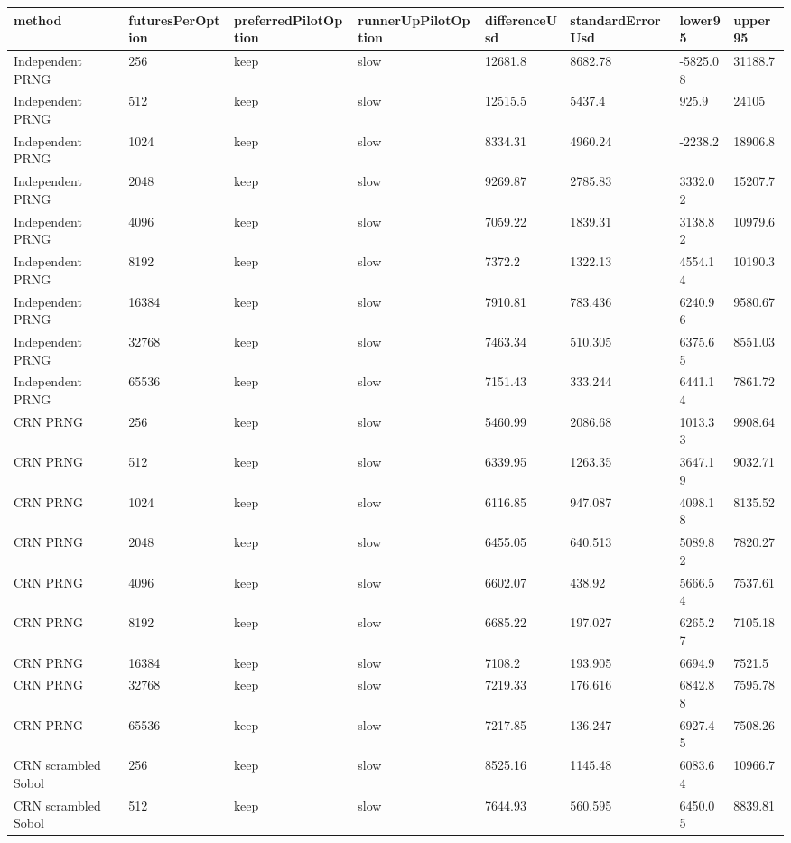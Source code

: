 \begin{tabular}{llllllll}
\toprule
method & futuresPerOption & preferredPilotOption & runnerUpPilotOption & differenceUsd & standardErrorUsd & lower95 & upper95 \\
\midrule
Independent PRNG & 256 & keep & slow & 12681.8 & 8682.78 & -5825.08 & 31188.7 \\
Independent PRNG & 512 & keep & slow & 12515.5 & 5437.4 & 925.9 & 24105 \\
Independent PRNG & 1024 & keep & slow & 8334.31 & 4960.24 & -2238.2 & 18906.8 \\
Independent PRNG & 2048 & keep & slow & 9269.87 & 2785.83 & 3332.02 & 15207.7 \\
Independent PRNG & 4096 & keep & slow & 7059.22 & 1839.31 & 3138.82 & 10979.6 \\
Independent PRNG & 8192 & keep & slow & 7372.2 & 1322.13 & 4554.14 & 10190.3 \\
Independent PRNG & 16384 & keep & slow & 7910.81 & 783.436 & 6240.96 & 9580.67 \\
Independent PRNG & 32768 & keep & slow & 7463.34 & 510.305 & 6375.65 & 8551.03 \\
Independent PRNG & 65536 & keep & slow & 7151.43 & 333.244 & 6441.14 & 7861.72 \\
CRN PRNG & 256 & keep & slow & 5460.99 & 2086.68 & 1013.33 & 9908.64 \\
CRN PRNG & 512 & keep & slow & 6339.95 & 1263.35 & 3647.19 & 9032.71 \\
CRN PRNG & 1024 & keep & slow & 6116.85 & 947.087 & 4098.18 & 8135.52 \\
CRN PRNG & 2048 & keep & slow & 6455.05 & 640.513 & 5089.82 & 7820.27 \\
CRN PRNG & 4096 & keep & slow & 6602.07 & 438.92 & 5666.54 & 7537.61 \\
CRN PRNG & 8192 & keep & slow & 6685.22 & 197.027 & 6265.27 & 7105.18 \\
CRN PRNG & 16384 & keep & slow & 7108.2 & 193.905 & 6694.9 & 7521.5 \\
CRN PRNG & 32768 & keep & slow & 7219.33 & 176.616 & 6842.88 & 7595.78 \\
CRN PRNG & 65536 & keep & slow & 7217.85 & 136.247 & 6927.45 & 7508.26 \\
CRN scrambled Sobol & 256 & keep & slow & 8525.16 & 1145.48 & 6083.64 & 10966.7 \\
CRN scrambled Sobol & 512 & keep & slow & 7644.93 & 560.595 & 6450.05 & 8839.81 \\

\end{tabular}
